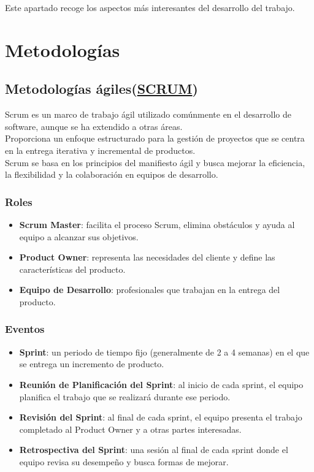 
Este apartado recoge los aspectos más interesantes del desarrollo del trabajo.


\section{Metodologías}

\subsection{Metodologías ágiles(\href{https://www.scrum.org/}{SCRUM})}
Scrum es un marco de trabajo ágil utilizado comúnmente en el desarrollo de software, 
aunque se ha extendido a otras áreas. \\
Proporciona un enfoque estructurado para la gestión de proyectos que se centra en la entrega 
iterativa y incremental de productos. \\
Scrum se basa en los principios del manifiesto ágil y busca mejorar la eficiencia, 
la flexibilidad y la colaboración en equipos de desarrollo.

\subsubsection{Roles}

\begin{itemize}
   \item \textbf{Scrum Master}: facilita el proceso Scrum, elimina obstáculos y ayuda al equipo a alcanzar sus objetivos.
   \item \textbf{Product Owner}: representa las necesidades del cliente y define las características del producto.
   \item \textbf{Equipo de Desarrollo}: profesionales que trabajan en la entrega del producto.
\end{itemize}

\subsubsection{Eventos}

\begin{itemize}
   \item \textbf{Sprint}: un periodo de tiempo fijo (generalmente de 2 a 4 semanas) en el que se entrega un incremento de producto.
   \item \textbf{Reunión de Planificación del Sprint}: al inicio de cada sprint, el equipo planifica el trabajo que se realizará durante ese periodo.
   \item \textbf{Revisión del Sprint}: al final de cada sprint, el equipo presenta el trabajo completado al Product Owner y a otras partes interesadas.
   \item \textbf{Retrospectiva del Sprint}: una sesión al final de cada sprint donde el equipo revisa su desempeño y busca formas de mejorar.
\end{itemize}

